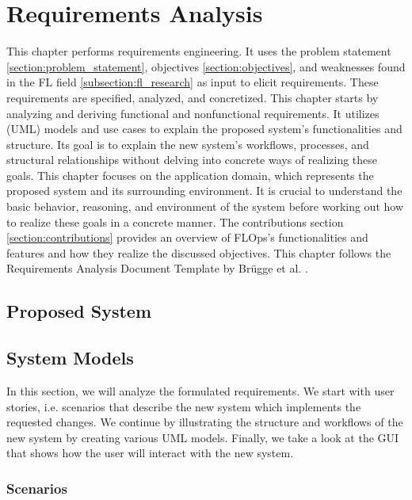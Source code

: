\chapter{Requirements Analysis}

This chapter performs requirements engineering.
It uses the problem statement \ref{section:problem_statement}, objectives \ref{section:objectives}, and weaknesses found in the FL field \ref{subsection:fl_research} as input to elicit requirements.
These requirements are specified, analyzed, and concretized. 
This chapter starts by analyzing and deriving functional and nonfunctional requirements.
It utilizes (UML) models and use cases to explain the proposed system's functionalities and structure.
Its goal is to explain the new system's workflows, processes, and structural relationships without delving into concrete ways of realizing these goals.
This chapter focuses on the application domain, which represents the proposed system and its surrounding environment.
It is crucial to understand the basic behavior, reasoning, and environment of the system before working out how to realize these goals in a concrete manner.
The contributions section \ref{section:contributions} provides an overview of FLOps's functionalities and features and how they realize the discussed objectives.
This chapter follows the Requirements Analysis Document Template by Brügge et al. \cite{book:bruegge}.

\section{Proposed System}





\section{System Models}

In this section, we will analyze the formulated requirements. We start with user stories, i.e. scenarios that describe the new system which implements the requested changes.
We continue by illustrating the structure and workflows of the new system by creating various UML models.
Finally, we take a look at the GUI that shows how the user will interact with the new system.

\subsection{Scenarios}

